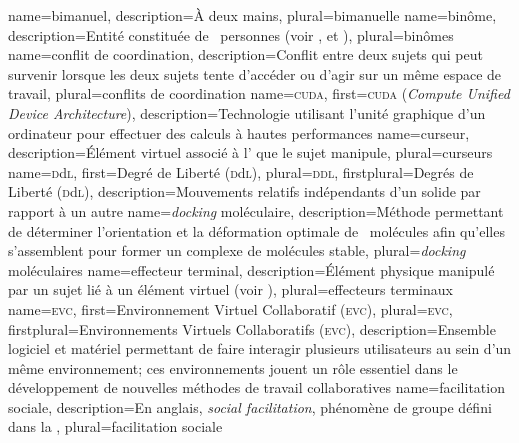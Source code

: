 %
{%
	name={bimanuel},%
	description={À deux mains},%
	plural={bimanuelle}%
}
%
{%
	name={binôme},%
	description={Entité constituée de ~personnes (voir ,  et )},%
	plural={binômes}%
}
%
{%
	name={conflit de coordination},%
	description={Conflit entre deux sujets qui peut survenir lorsque les deux sujets tente d'accéder ou d'agir sur un même espace de travail},
	plural={conflits de coordination}%
}
%
{%
	name={\textsc{cuda}},%
	first={\textsc{cuda} (\textit{Compute Unified Device Architecture})},%
	description={Technologie utilisant l'unité graphique d'un ordinateur pour effectuer des calculs à hautes performances}%
}
%
{%
	name={curseur},%
	description={Élément virtuel associé à l' que le sujet manipule},%
	plural={curseurs}%
}
%
{%
	name={\textsc{d}d\textsc{l}},%
	first={Degré de Liberté (\textsc{d}d\textsc{l})},%
	plural={\textsc{ddl}},%
	firstplural={Degrés de Liberté (\textsc{d}d\textsc{l})},%
	description={Mouvements relatifs indépendants d'un solide par rapport à un autre}%
}
%
{%
	name={\textit{docking} moléculaire},%
	description={Méthode permettant de déterminer l'orientation et la déformation optimale de ~molécules afin qu'elles s'assemblent pour former un complexe de molécules stable},%
	plural={\textit{docking} moléculaires}%
}
%
{%
	name={effecteur terminal},%
	description={Élément physique manipulé par un sujet lié à un élément virtuel (voir )},%
	plural={effecteurs terminaux}%
}
%
{%
	name={\textsc{evc}},%
	first={Environnement Virtuel Collaboratif (\textsc{evc})},%
	plural={\textsc{evc}},%
	firstplural={Environnements Virtuels Collaboratifs (\textsc{evc})},%
	description={Ensemble logiciel et matériel permettant de faire interagir plusieurs utilisateurs au sein d'un même environnement; ces environnements jouent un rôle essentiel dans le développement de nouvelles méthodes de travail collaboratives}%
}
%
{%
	name={facilitation sociale},%
	description={En anglais, \textit{social facilitation}, phénomène de groupe défini dans la },
	plural={facilitation sociale}%
}
%
